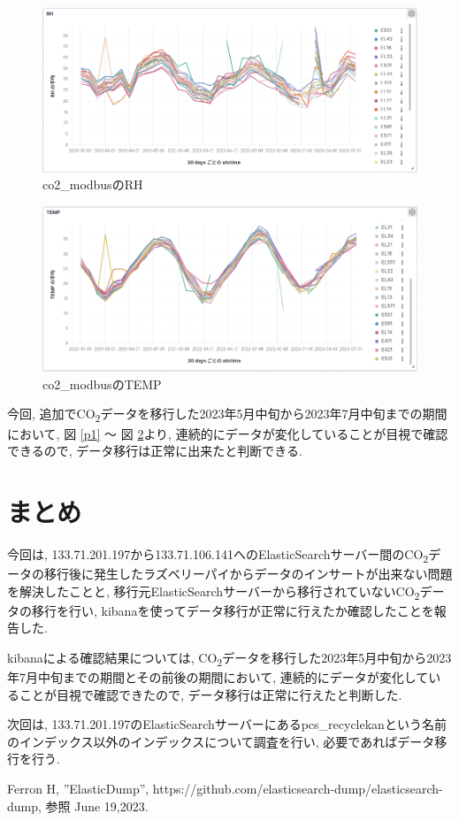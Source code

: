 \documentclass[a4j,12pt,]{jarticle}
\begin{document}
\begin{figure}[H]
  \begin{center}
    \includegraphics[width=160mm]{rh.png}
    \caption{co2\_modbusのRH}
    \label{p2}
  \end{center}
\end{figure}

\begin{figure}[H]
  \begin{center}
    \includegraphics[width=160mm]{temp.png}
    \caption{co2\_modbusのTEMP}
    \label{p3}
  \end{center}
\end{figure}

今回, 追加でCO\textsubscript{2}データを移行した2023年5月中旬から2023年7月中旬までの期間において, 図 \ref{p1} 〜 図 \ref{p3}より, 連続的にデータが変化していることが目視で確認できるので, データ移行は正常に出来たと判断できる.

\section{まとめ}
今回は, 133.71.201.197から133.71.106.141へのElasticSearchサーバー間のCO\textsubscript{2}データの移行後に発生したラズベリーパイからデータのインサートが出来ない問題を解決したことと, 移行元ElasticSearchサーバーから移行されていないCO\textsubscript{2}データの移行を行い, kibanaを使ってデータ移行が正常に行えたか確認したことを報告した.

kibanaによる確認結果については, CO\textsubscript{2}データを移行した2023年5月中旬から2023年7月中旬までの期間とその前後の期間において, 連続的にデータが変化していることが目視で確認できたので, データ移行は正常に行えたと判断した.

次回は, 133.71.201.197のElasticSearchサーバーにあるpcs\_recyclekanという名前のインデックス以外のインデックスについて調査を行い, 必要であればデータ移行を行う.

\begin{thebibliography}{5}
  Ferron H, ”ElasticDump”, https://github.com/elasticsearch-dump/elasticsearch-dump, 参照 June 19,2023.
\end{thebibliography}
\end{document}
